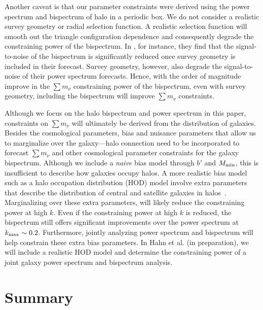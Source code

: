 \documentclass[12pt, letterpaper, preprint]{aastex62}
\newcommand{\smnu}{\sum m_\nu}
\begin{document}
Another caveat is that our parameter constraints were derived using the power 
spectrum and bispectrum of halo in a periodic box. We do not consider a 
realistic survey geometry or radial selection function. A realistic selection 
function will smooth out the triangle configuration dependence and consequently 
degrade the constraining power of the bispectrum. In \cite{sefusatti2005}, for 
instance, they find that the signal-to-noise of the bispectrum is significantly 
reduced once survey geometry is included in their forecast. Survey geometry, 
however, also degrade the signal-to-noise of their power spectrum forecasts. 
Hence, with the order of magnitude improve in the $\smnu$ constraining power 
of the bispectrum, even with survey geometry, including the bispectrum will 
improve $\smnu$ constraints. 

Although we focus on the halo bispectrum and power spectrum in this paper, 
constraints on $\smnu$ will ultimately be derived from the distribution of 
galaxies. Besides the cosmological parameters, bias and nuisance parameters 
that allow us to marginalize over the galaxy---halo connection need to be
incorporated to forecast $\smnu$ and other cosmological parameter constraints 
for the galaxy bispectrum. Although we include a \emph{naive} bias model 
through $b'$ and $M_{\rm min}$, this is insufficient to describe how galaxies
occupy halos. A more realistic bias model such as a halo occupation distribution 
(HOD) model involve extra parameters that describe the distribution of central 
and satellite galaxies in halos~\citep[\emph{e.g.}][]{zheng2005,leauthaud2012a,tinker2013,zentner2016,vakili2019}. 
Marginalizing over these extra parameters, will likely reduce the constraining 
power at high $k$. Even if the constraining power at high $k$ is reduced, the
bispectrum still offers significant improvements over the power spectrum at 
$k_{\rm max} \sim 0.2$. Furthermore, jointly analyzing power spectrum and 
bispectrum will help constrain these extra bias parameters. In Hahn et al. 
(in preparation), we will include a realistic HOD model and determine the 
constraining power of a joint galaxy power spectrum and bispectrum analysis. 

\section{Summary} 
\end{document}
